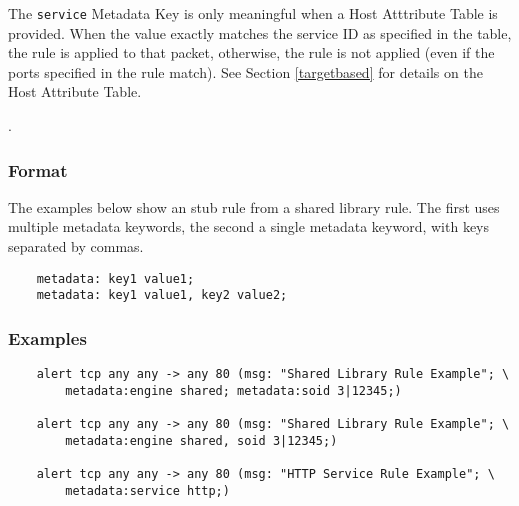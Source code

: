 \documentclass[english]{report}
\newenvironment{note}{
\samepage
    \vspace{10pt}{\textsf{
        {\hspace{7pt}\Huge{$\triangle$\hspace{-12.5pt}{\Large{$^!$}}}}\hspace{5pt}
        {\Large{NOTE}}
    }
    }
   \begin{center}
    \par\vspace{-17pt}

    \begin{lrbox}{\savepar}
    \begin{minipage}[r]{6in}
}
{
    \end{minipage}
    \end{lrbox}
    \fbox{
        \usebox{
            \savepar
	}
    }
    \par\vskip10pt
    \end{center}
}
\newenvironment{note}{
        \begin{rawhtml}
        <p><table border="1"><tr><td><b>
        Note:&nbsp;&nbsp;</b>
        \end{rawhtml}
}{
        \begin{rawhtml}
        </b></td></tr></table></p>
        \end{rawhtml}
}
\begin{document}
\begin{note}

The \texttt{service} Metadata Key is only meaningful when a Host Atttribute
Table is provided.  When the value exactly matches the service ID as specified
in the table, the rule is applied to that packet, otherwise, the rule is not
applied (even if the ports specified in the rule match).  See Section
\ref{targetbased} for details on the Host Attribute Table.

\end{note}.

\subsubsection{Format}

The examples below show an stub rule from a shared library rule.  The first
uses multiple metadata keywords, the second a single metadata keyword, with
keys separated by commas.

\begin{verbatim}
    metadata: key1 value1;
    metadata: key1 value1, key2 value2;
\end{verbatim}

\subsubsection{Examples}

\begin{verbatim}
    alert tcp any any -> any 80 (msg: "Shared Library Rule Example"; \
        metadata:engine shared; metadata:soid 3|12345;)

    alert tcp any any -> any 80 (msg: "Shared Library Rule Example"; \
        metadata:engine shared, soid 3|12345;)

    alert tcp any any -> any 80 (msg: "HTTP Service Rule Example"; \
        metadata:service http;)
\end{verbatim}
\end{document}
